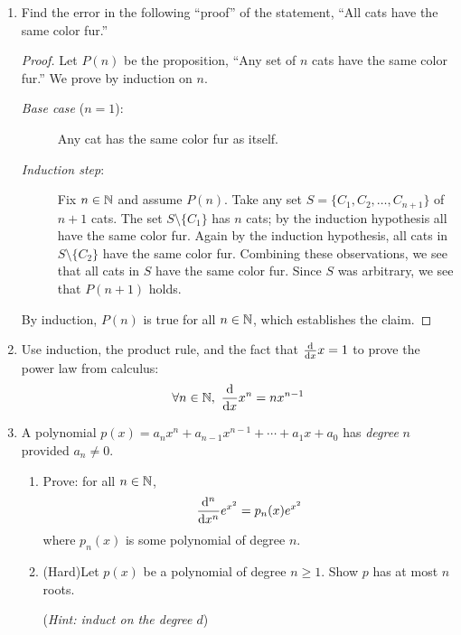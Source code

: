 \begin{exercises}{}{}
\begin{enumerate}
		\item Find the error in the following ``proof'' of the statement, ``All cats have the same color fur.''
		\begin{proof}
	    Let $P(n)$ be the proposition, ``Any set of $n$ cats have the same color fur.'' We prove by induction on $n$. 
	    \begin{description}
	    	\item[\normalfont\emph{Base case} ($n=1$):] Any cat has the same color fur as itself.
	    	\item[\normalfont\emph{Induction step}:] Fix $n\in\N$ and assume $P(n)$. Take any set $S= \{C_1,C_2,\ldots,C_{n+1}\}$ of $n+1$ cats. The set $S\setminus\{C_1\}$ has $n$ cats; by the induction hypothesis all have the same color fur. Again by the induction hypothesis, all cats in $S\setminus\{C_2\}$ have the same color fur. Combining these observations, we see that all cats in $S$ have the same color fur. Since $S$ was arbitrary, we see that $P(n+1)$ holds.
	    \end{description}
	    By induction, $P(n)$ is true for all $n\in\N$, which establishes the claim.
		\end{proof}

		\item Use induction, the product rule, and the fact that $\diff xx=1$ to prove the power law from calculus:
		\[
	    \forall n\in\N,\ \diff x x^n =nx^{n-1}
		\]

		\item A polynomial $p(x)=a_nx^n+a_{n-1}x^{n-1}+ \cdots +a_1x+a_0$ has \emph{degree} $n$ provided $a_n\neq 0$.
		\begin{enumerate}
    	\item Prove: for all $n\in\N$,
    	\[
        \diff[{}^n]{x^n} e^{x^2} = p_n(x) e^{x^2}
    	\]
    	where $p_n(x)$ is some polynomial of degree $n$.

			\item (Hard)\lstsp Let $p(x)$ be a polynomial of degree $n\ge 1$. Show $p$ has at most $n$ roots.\par
			(\emph{Hint: induct on the degree $d$})
		\end{enumerate}



\end{enumerate}
\end{exercises}
